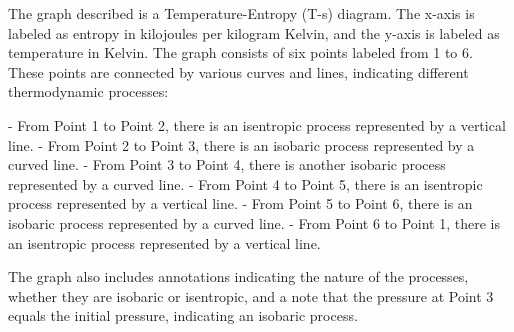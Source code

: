 The graph described is a Temperature-Entropy (T-s) diagram. The x-axis is labeled as entropy in kilojoules per kilogram Kelvin, and the y-axis is labeled as temperature in Kelvin. The graph consists of six points labeled from 1 to 6. These points are connected by various curves and lines, indicating different thermodynamic processes:

- From Point 1 to Point 2, there is an isentropic process represented by a vertical line.
- From Point 2 to Point 3, there is an isobaric process represented by a curved line.
- From Point 3 to Point 4, there is another isobaric process represented by a curved line.
- From Point 4 to Point 5, there is an isentropic process represented by a vertical line.
- From Point 5 to Point 6, there is an isobaric process represented by a curved line.
- From Point 6 to Point 1, there is an isentropic process represented by a vertical line.

The graph also includes annotations indicating the nature of the processes, whether they are isobaric or isentropic, and a note that the pressure at Point 3 equals the initial pressure, indicating an isobaric process.